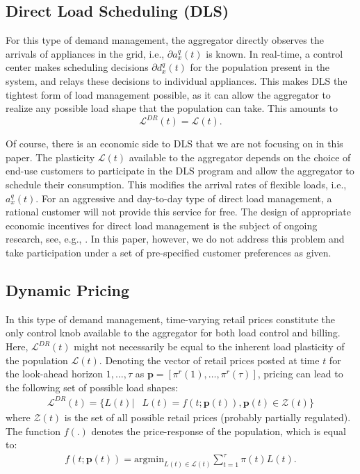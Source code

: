 \documentclass[10pt]{IEEEtran}
\begin{document}
\subsection{Direct Load Scheduling (DLS)}\label{drtypes} For this type of demand management, the aggregator directly observes the arrivals of appliances in the grid, i.e.,   $\partial a^q_x(t)$ is known. In real-time, a control center makes scheduling decisions $\partial d^q_x(t)$ for the population present in the system, and relays these decisions to individual appliances. This makes DLS the tightest form of load management possible, as it can allow the aggregator to realize any possible load shape that the population can take. This amounts to
\begin{equation}{\mathcal L}^{DR}(t) = {\mathcal L}(t).\end{equation}

Of course, there is an economic side to DLS that we are not focusing on in this paper. The plasticity ${\mathcal L}(t)$ available to the aggregator depends on the choice of end-use customers to participate in the DLS program and allow the aggregator to schedule their consumption. This modifies the arrival rates of flexible loads, i.e., $a^q_x(t)$. For an aggressive and day-to-day type of direct load management, a rational customer will not provide this service for free. The design of appropriate economic incentives for direct load management is the subject of ongoing research, see, e.g., \cite{alizadeh, bitar2012deadline,kefayati}. In this paper, however, we do not address this problem and take  participation under a set of pre-specified customer preferences as given.




\subsection{Dynamic Pricing} In this type of demand management, time-varying retail prices constitute the only control knob available to the aggregator for both load control and billing. Here, ${\mathcal L}^{DR}(t)$ might not necessarily be equal to the inherent load plasticity of the population  ${\mathcal L}(t)$. Denoting the vector of retail prices posted at time $t$ for the look-ahead horizon $1,\ldots,\tau$ as $\mathbf{p} = [\pi^r(1),\ldots, \pi^r(\tau)]$, pricing can lead to the following set of possible load shapes:
\begin{align}
{\mathcal L}^{DR}(t) = \big\{ L(t) |& L(t) = f(t;\mathbf{p}(t)), \mathbf{p}(t) \in \mathcal{Z}(t) \big\}
\end{align}
where $\mathcal{Z}(t)$ is the set of all possible retail prices (probably partially regulated). The function $f(.)$ denotes the price-response of the population, which is equal to: 
\begin{align}\label{priceresp}
 f(t;\mathbf{p}(t)) = \mbox{argmin}_{L(t) \in \mathcal{L}(t)} \sum_{t = 1}^{\tau} \pi(t) L(t).
\end{align}
\end{document}
